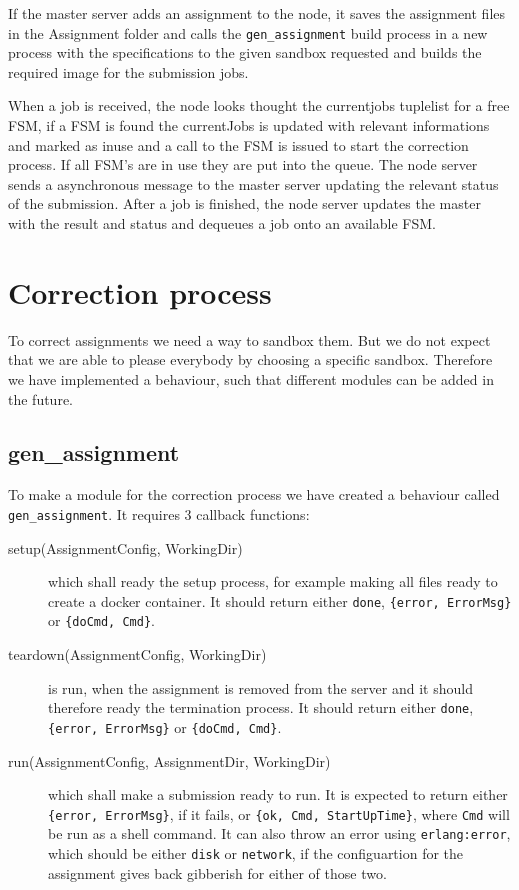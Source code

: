 If the master server adds an assignment to the node, it saves the assignment files in the Assignment folder and calls the \texttt{gen\_assignment} build process in a new process with the specifications to the given sandbox requested and builds the required image for the submission jobs.

When a job is received, the node looks thought the currentjobs tuplelist for a free FSM, if a FSM is found the currentJobs is updated with relevant informations and marked as inuse and a call to the FSM is issued to start the correction process. If all FSM's are in use they are put into the queue. The node server sends a asynchronous message to the master server updating the relevant status of the submission. After a job is finished, the node server updates the master with the result and status and dequeues a job onto an available FSM.

\section{Correction process}
To correct assignments we need a way to sandbox them. But we do not expect that
we are able to please everybody by choosing a specific sandbox. Therefore we
have implemented a behaviour, such that different modules can be added in the
future.

\subsection{gen\_assignment}
To make a module for the correction process we have created a behaviour called
\texttt{gen\_assignment}. It requires 3 callback functions:
\begin{description}
    \item[setup(AssignmentConfig, WorkingDir)] which shall ready the setup
    process, for example making all files ready to create a docker container.
    It should return either \texttt{done}, \texttt{\{error, ErrorMsg\}} or
    \texttt{\{doCmd, Cmd\}}.
    \item[teardown(AssignmentConfig, WorkingDir)] is run, when the assignment is
    removed from the server and it should therefore ready the termination
    process. It should return either \texttt{done}, \texttt{\{error, ErrorMsg\}}
    or \texttt{\{doCmd, Cmd\}}.
    \item[run(AssignmentConfig, AssignmentDir, WorkingDir)] which shall make a
    submission ready to run. It is expected to return either
    \texttt{\{error, ErrorMsg\}}, if it fails, or
    \texttt{\{ok, Cmd, StartUpTime\}}, where \texttt{Cmd} will be run as a shell
    command. It can also throw an error using \texttt{erlang:error}, which
    should be either \texttt{disk} or \texttt{network}, if the configuartion for the
    assignment gives back gibberish for either of those two.
\end{description}

